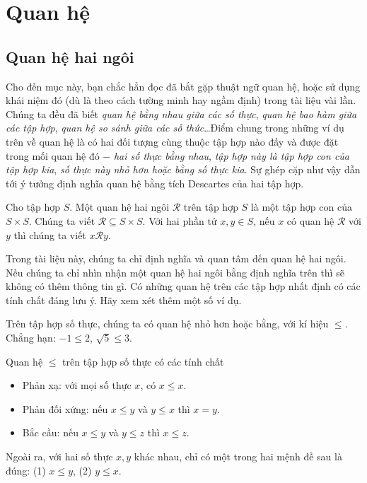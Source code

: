 \section{Quan hệ}

\subsection{Quan hệ hai ngôi}

Cho đến mục này, bạn chắc hẳn đọc đã bắt gặp thuật ngữ quan hệ, hoặc sử dụng khái niệm đó (dù là theo cách tường minh hay ngầm định) trong tài liệu vài lần. Chúng ta đều đã biết \textit{quan hệ bằng nhau giữa các số thực}, \textit{quan hệ bao hàm giữa các tập hợp}, \textit{quan hệ so sánh giữa các số thức}\ldots Điểm chung trong những ví dụ trên về quan hệ là có hai đối tượng cùng thuộc tập hợp nào đấy và được đặt trong mối quan hệ đó $-$ \textit{hai số thực bằng nhau}, \textit{tập hợp này là tập hợp con của tập hợp kia}, \textit{số thực này nhỏ hơn hoặc bằng số thực kia}. Sự ghép cặp như vậy dẫn tới ý tưởng định nghĩa quan hệ bằng tích Descartes của hai tập hợp.

\begin{definition}
    Cho tập hợp $S$. Một quan hệ hai ngôi $\mathscr{R}$ trên tập hợp $S$ là một tập hợp con của $S\times S$. Chúng ta viết $\mathscr{R}\subseteq S\times S$. Với hai phần tử $x, y\in S$, nếu $x$ có quan hệ $\mathscr{R}$ với $y$ thì chúng ta viết $x\mathscr{R}y$.
\end{definition}

Trong tài liệu này, chúng ta chỉ định nghĩa và quan tâm đến quan hệ hai ngôi. Nếu chúng ta chỉ nhìn nhận một quan hệ hai ngôi bằng định nghĩa trên thì sẽ không có thêm thông tin gì. Có những quan hệ trên các tập hợp nhất định có các tính chất đáng lưu ý. Hãy xem xét thêm một số ví dụ.

\begin{example}
    Trên tập hợp số thực, chúng ta có quan hệ nhỏ hơn hoặc bằng, với kí hiệu $\leq$. Chẳng hạn: $-1\leq 2$, $\sqrt{5}\leq 3$.

    \noindent Quan hệ $\leq$ trên tập hợp số thực có các tính chất
    \begin{itemize}
        \item Phản xạ: với mọi số thực $x$, có $x\leq x$.
        \item Phản đối xứng: nếu $x\leq y$ và $y\leq x$ thì $x = y$.
        \item Bắc cầu: nếu $x\leq y$ và $y\leq z$ thì $x\leq z$.
    \end{itemize}

    Ngoài ra, với hai số thực $x, y$ khác nhau, chỉ có một trong hai mệnh đề sau là đúng: (1) $x\leq y$, (2) $y\leq x$.
\end{example}

